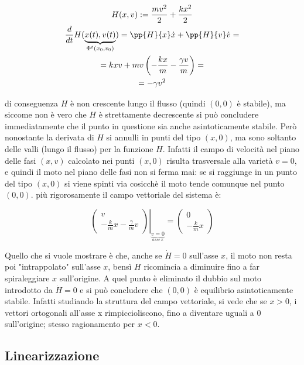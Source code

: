 \documentclass[Main.tex]{subfiles}
\begin{document}
\begin{tema}
\begin{gather}
   H(x,v) := \frac{mv^2}{2} + \frac{kx^2}{2}\\
 \frac{d}{dt}H(\underbrace{x(t),v(t)}_{\Phi^t(x_0,v_0)}) =\pp{H}{x} \dot x + \pp{H}{v} \dot v=\\=
  k xv + mv \left( - \frac{kx}{m} - \frac{\gamma v}{m} \right)=\\
= - \gamma v^2
\end{gather}

di conseguenza $H$ è non crescente lungo il flusso (quindi $(0,0)$ è stabile), ma siccome non è vero che $H$ è strettamente decrescente si può concludere immediatamente che il punto in questione sia anche asintoticamente stabile. Però nonostante la derivata di $H$ si annulli in punti del tipo $(x,0)$, ma sono soltanto delle valli (lungo il flusso) per la funzione $H$. Infatti il campo di velocità nel piano delle fasi $(x,v)$ calcolato nei punti $(x,0)$ risulta trasversale alla varietà $v=0$, e quindi il moto nel piano delle fasi non si ferma mai: se si raggiunge in un punto del tipo $(x,0)$ si viene spinti via cosicchè il moto tende comunque nel punto $(0,0)$. più rigorosamente il campo vettoriale del sistema è:

\begin{equation}
  \left.
\left( \begin{array}{c}
v \\ -\frac{k}{m}x - \frac{\gamma}{m}v
\end{array} \right)  \right|_{\underbrace{v=0}_{asse \ x}}  = \left( \begin{array}{c}
 0 \\ - \frac{k}{m}x
 \end{array} \right)
\end{equation}
 
Quello che si vuole mostrare è che, anche se $\dot H=0$ sull'asse $x$, il moto non resta poi "intrappolato" sull'asse $x$, bensì $H$ ricomincia a diminuire fino a far spiraleggiare $x$ sull'origine. A quel punto è eliminato il dubbio sul moto introdotto da $\dot H=0$ e si può concludere che $(0,0)$ è equilibrio asintoticamente stabile.
Infatti studiando la struttura del campo vettoriale, si vede che se $x>0$, i vettori ortogonali all'asse x rimpiccioliscono, fino a diventare uguali a 0 sull'origine; stesso ragionamento per $x<0$.
\end{tema}


\subsection{Linearizzazione}
\end{document}
